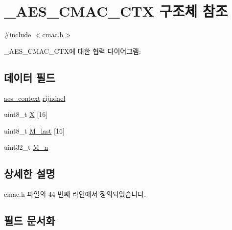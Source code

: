 \hypertarget{struct___a_e_s___c_m_a_c___c_t_x}{}\section{\+\_\+\+A\+E\+S\+\_\+\+C\+M\+A\+C\+\_\+\+C\+TX 구조체 참조}
\label{struct___a_e_s___c_m_a_c___c_t_x}


{\ttfamily \#include $<$cmac.\+h$>$}



\+\_\+\+A\+E\+S\+\_\+\+C\+M\+A\+C\+\_\+\+C\+T\+X에 대한 협력 다이어그램\+:
\subsection*{데이터 필드}
\begin{DoxyCompactItemize}
\item 
\mbox{\hyperlink{structaes__context}{aes\+\_\+context}} \mbox{\hyperlink{struct___a_e_s___c_m_a_c___c_t_x_a88a77ff6dbb35e9474eeadae3e3acb57}{rijndael}}
\item 
uint8\+\_\+t \mbox{\hyperlink{struct___a_e_s___c_m_a_c___c_t_x_a1d1d5ffaf044ddb7557628df0408c1fc}{X}} \mbox{[}16\mbox{]}
\item 
uint8\+\_\+t \mbox{\hyperlink{struct___a_e_s___c_m_a_c___c_t_x_a12a61c71dde0352a03f81b2ca88d860d}{M\+\_\+last}} \mbox{[}16\mbox{]}
\item 
uint32\+\_\+t \mbox{\hyperlink{struct___a_e_s___c_m_a_c___c_t_x_a31454f2f0e06ae96c41867c51745659c}{M\+\_\+n}}
\end{DoxyCompactItemize}


\subsection{상세한 설명}


cmac.\+h 파일의 44 번째 라인에서 정의되었습니다.



\subsection{필드 문서화}
\mbox{\label{struct___a_e_s___c_m_a_c___c_t_x_a12a61c71dde0352a03f81b2ca88d860d}} 
